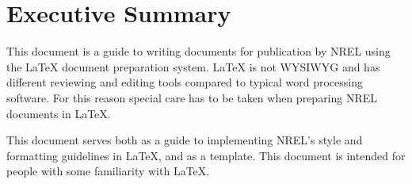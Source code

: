 \section*{Executive Summary}
This document is a guide to writing documents for publication by NREL using the LaTeX document preparation system. LaTeX is not WYSIWYG and has different reviewing and editing tools compared to typical word processing software. For this reason special care has to be taken when preparing NREL documents in LaTeX. 

This document serves both as a guide to implementing NREL's style and formatting guidelines in LaTeX, and as a template. This document is intended for people with some familiarity with LaTeX.